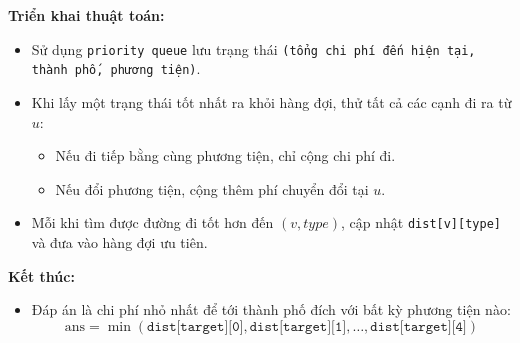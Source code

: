 \textbf{Triển khai thuật toán:}
\begin{itemize}
    \item Sử dụng \texttt{priority queue} lưu trạng thái \texttt{(tổng chi phí đến hiện tại, thành phố, phương tiện)}.
    \item Khi lấy một trạng thái tốt nhất ra khỏi hàng đợi, thử tất cả các cạnh đi ra từ $u$:
        \begin{itemize}
            \item Nếu đi tiếp bằng cùng phương tiện, chỉ cộng chi phí đi.
            \item Nếu đổi phương tiện, cộng thêm phí chuyển đổi tại $u$.
        \end{itemize}
    \item Mỗi khi tìm được đường đi tốt hơn đến $(v, type)$, cập nhật \texttt{dist[v][type]} và đưa vào hàng đợi ưu tiên.
\end{itemize}

\textbf{Kết thúc:}
\begin{itemize}
    \item Đáp án là chi phí nhỏ nhất để tới thành phố đích với bất kỳ phương tiện nào:
    \[
    \text{ans} = \min(\texttt{dist[target][0]}, \texttt{dist[target][1]}, \ldots, \texttt{dist[target][4]})
    \]
\end{itemize}


